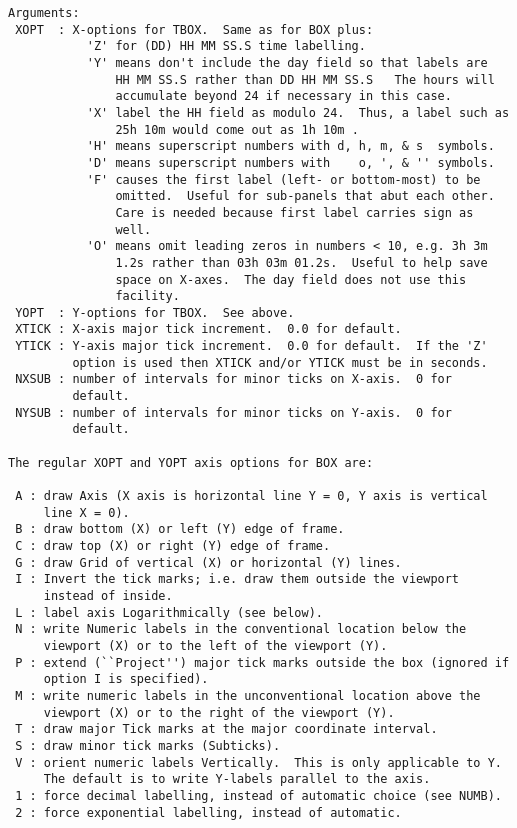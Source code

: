 \begin{verbatim}
Arguments:
 XOPT  : X-options for TBOX.  Same as for BOX plus: 
           'Z' for (DD) HH MM SS.S time labelling.
           'Y' means don't include the day field so that labels are
               HH MM SS.S rather than DD HH MM SS.S   The hours will 
               accumulate beyond 24 if necessary in this case.  
           'X' label the HH field as modulo 24.  Thus, a label such as
               25h 10m would come out as 1h 10m .
           'H' means superscript numbers with d, h, m, & s  symbols. 
           'D' means superscript numbers with    o, ', & '' symbols.
           'F' causes the first label (left- or bottom-most) to be
               omitted.  Useful for sub-panels that abut each other.
               Care is needed because first label carries sign as
               well.  
           'O' means omit leading zeros in numbers < 10, e.g. 3h 3m
               1.2s rather than 03h 03m 01.2s.  Useful to help save
               space on X-axes.  The day field does not use this
               facility. 
 YOPT  : Y-options for TBOX.  See above.
 XTICK : X-axis major tick increment.  0.0 for default.
 YTICK : Y-axis major tick increment.  0.0 for default.  If the 'Z'
         option is used then XTICK and/or YTICK must be in seconds. 
 NXSUB : number of intervals for minor ticks on X-axis.  0 for
         default. 
 NYSUB : number of intervals for minor ticks on Y-axis.  0 for
         default. 

The regular XOPT and YOPT axis options for BOX are:

 A : draw Axis (X axis is horizontal line Y = 0, Y axis is vertical
     line X = 0). 
 B : draw bottom (X) or left (Y) edge of frame.
 C : draw top (X) or right (Y) edge of frame.
 G : draw Grid of vertical (X) or horizontal (Y) lines.
 I : Invert the tick marks; i.e. draw them outside the viewport
     instead of inside.  
 L : label axis Logarithmically (see below).
 N : write Numeric labels in the conventional location below the
     viewport (X) or to the left of the viewport (Y). 
 P : extend (``Project'') major tick marks outside the box (ignored if
     option I is specified). 
 M : write numeric labels in the unconventional location above the
     viewport (X) or to the right of the viewport (Y). 
 T : draw major Tick marks at the major coordinate interval.
 S : draw minor tick marks (Subticks).
 V : orient numeric labels Vertically.  This is only applicable to Y.
     The default is to write Y-labels parallel to the axis.
 1 : force decimal labelling, instead of automatic choice (see NUMB). 
 2 : force exponential labelling, instead of automatic.


\end{verbatim}
